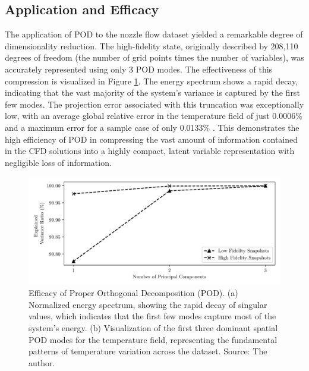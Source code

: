 \documentclass[tg, EN]{ufabcFHZh_tg}
\begin{document}
\subsection{Application and Efficacy}

The application of POD to the nozzle flow dataset yielded a remarkable degree of dimensionality reduction. The high-fidelity state, originally described by 208,110 degrees of freedom (the number of grid points times the number of variables), was accurately represented using only 3 POD modes. The effectiveness of this compression is visualized in Figure \ref{fig:pod_results}. The energy spectrum shows a rapid decay, indicating that the vast majority of the system's variance is captured by the first few modes. The projection error associated with this truncation was exceptionally low, with an average global relative error in the temperature field of just 0.0006\% and a maximum error for a sample case of only 0.0133\% \citep{moreira2023}. This demonstrates the high efficiency of POD in compressing the vast amount of information contained in the CFD solutions into a highly compact, latent variable representation with negligible loss of information.

\begin{figure}[H]
    \centering
    \includegraphics[width=\textwidth]{../latex_src/Figuras/POD_energy.pdf}
    \caption{Efficacy of Proper Orthogonal Decomposition (POD). (a) Normalized energy spectrum, showing the rapid decay of singular values, which indicates that the first few modes capture most of the system's energy. (b) Visualization of the first three dominant spatial POD modes for the temperature field, representing the fundamental patterns of temperature variation across the dataset. Source: The author.}
    \label{fig:pod_results}
\end{figure}
\end{document}
